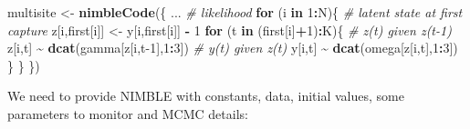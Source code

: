 \documentclass[
  12pt,
]{krantz}
\newenvironment{Shaded}{\begin{snugshade}}{\end{snugshade}}
\newcommand{\CommentTok}[1]{\textcolor[rgb]{0.56,0.35,0.01}{\textit{#1}}}
\newcommand{\ControlFlowTok}[1]{\textcolor[rgb]{0.13,0.29,0.53}{\textbf{#1}}}
\newcommand{\DecValTok}[1]{\textcolor[rgb]{0.00,0.00,0.81}{#1}}
\newcommand{\FunctionTok}[1]{\textcolor[rgb]{0.13,0.29,0.53}{\textbf{#1}}}
\newcommand{\NormalTok}[1]{#1}
\newcommand{\OtherTok}[1]{\textcolor[rgb]{0.56,0.35,0.01}{#1}}
\newcommand{\SpecialCharTok}[1]{\textcolor[rgb]{0.81,0.36,0.00}{\textbf{#1}}}
\begin{document}
\begin{Shaded}
\begin{Highlighting}[]
\NormalTok{multisite }\OtherTok{\textless{}{-}} \FunctionTok{nimbleCode}\NormalTok{(\{}
\NormalTok{...}
  \CommentTok{\# likelihood}
  \ControlFlowTok{for}\NormalTok{ (i }\ControlFlowTok{in} \DecValTok{1}\SpecialCharTok{:}\NormalTok{N)\{}
    \CommentTok{\# latent state at first capture}
\NormalTok{    z[i,first[i]] }\OtherTok{\textless{}{-}}\NormalTok{ y[i,first[i]] }\SpecialCharTok{{-}} \DecValTok{1}
    \ControlFlowTok{for}\NormalTok{ (t }\ControlFlowTok{in}\NormalTok{ (first[i]}\SpecialCharTok{+}\DecValTok{1}\NormalTok{)}\SpecialCharTok{:}\NormalTok{K)\{}
      \CommentTok{\# z(t) given z(t{-}1)}
\NormalTok{      z[i,t] }\SpecialCharTok{\textasciitilde{}} \FunctionTok{dcat}\NormalTok{(gamma[z[i,t}\DecValTok{{-}1}\NormalTok{],}\DecValTok{1}\SpecialCharTok{:}\DecValTok{3}\NormalTok{])}
      \CommentTok{\# y(t) given z(t)}
\NormalTok{      y[i,t] }\SpecialCharTok{\textasciitilde{}} \FunctionTok{dcat}\NormalTok{(omega[z[i,t],}\DecValTok{1}\SpecialCharTok{:}\DecValTok{3}\NormalTok{])}
\NormalTok{    \}}
\NormalTok{  \}}
\NormalTok{\})}
\end{Highlighting}
\end{Shaded}

We need to provide NIMBLE with constants, data, initial values, some parameters to monitor and MCMC details:
\end{document}
